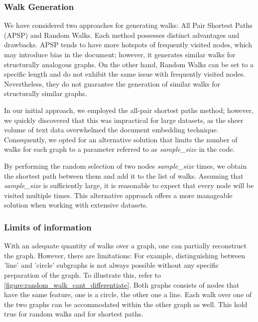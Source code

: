 \subsubsection{Walk Generation}
We have considered two approaches for generating walks: All Pair Shortest Paths (APSP) and Random Walks. Each method possesses distinct advantages and drawbacks. APSP tends to have more hotspots of frequently visited nodes, which may introduce bias in the document; however, it generates similar walks for structurally analogous graphs. On the other hand, Random Walks can be set to a specific length and do not exhibit the same issue with frequently visited nodes. Nevertheless, they do not guarantee the generation of similar walks for structurally similar graphs.

In our initial approach, we employed the all-pair shortest paths method; however, we quickly discovered that this was impractical for large datasets, as the sheer volume of text data overwhelmed the document embedding technique. Consequently, we opted for an alternative solution that limits the number of walks for each graph to a parameter referred to as \emph{sample\_size} in the code.

By performing the random selection of two nodes \emph{sample\_size} times, we obtain the shortest path between them and add it to the list of walks. Assuming that \emph{sample\_size} is sufficiently large, it is reasonable to expect that every node will be visited multiple times. This alternative approach offers a more manageable solution when working with extensive datasets.

\subsubsection{Limits of information}
With an adequate quantity of walks over a graph, one can partially reconstruct the graph. However, there are limitations: For example, distinguishing between 'line' and 'circle' subgraphs is not always possible without any specific preparation of the graph. To illustrate this, refer to \autoref{figure:random_walk_cant_differentiate}. Both graphs consists of nodes that have the same feature, one is a circle, the other one a line. Each walk over one of the two graphs can be accommodated within the other graph as well. This hold true for random walks and for shortest paths.

